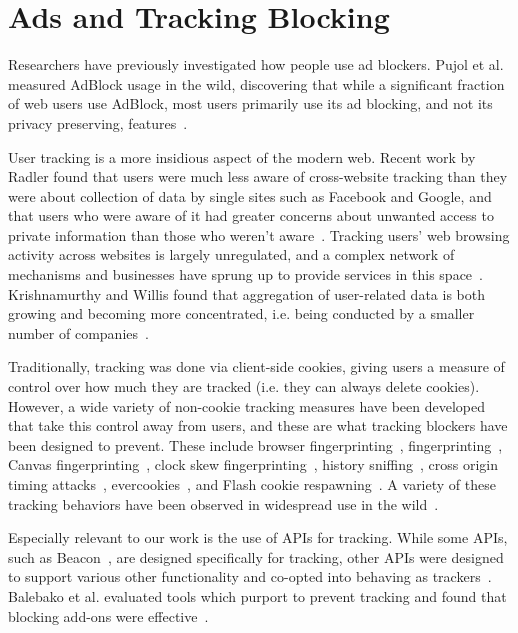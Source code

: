 \section{Ads and Tracking Blocking}
\label{background:ads-tracking-blocking}

Researchers have previously investigated how people use ad blockers.
Pujol et al. measured AdBlock usage in the wild, discovering that while a
significant fraction of web users use AdBlock, most users
primarily use its ad blocking, and not its privacy preserving,
features~\cite{pujolannoyed}.

User tracking is a more insidious aspect of the modern web. Recent work by Radler
found that users were much less aware of cross-website tracking than they were
about collection of data by single sites such as Facebook and Google, and that
users who were aware of it had greater concerns about unwanted access to
private information than those who weren't aware~\cite{rader2014awareness}.
Tracking users' web browsing activity across websites is largely unregulated,
and a complex network of mechanisms and businesses have sprung up to provide services
in this space~\cite{falahrastegar2014anatomy}.
Krishnamurthy and Willis found that aggregation of user-related data is both
growing and becoming more concentrated, i.e. being conducted by a smaller number
of companies~\cite{krishnamurthy2009privacy}.

Traditionally, tracking was done via client-side cookies, giving users a measure
of control over how much they are tracked (i.e. they can always delete cookies).
However, a wide variety of non-cookie tracking measures have been developed that
take this control away from users, and these are what tracking blockers have
been designed to prevent. These include browser
fingerprinting~\cite{eckersley2010unique}, \JS
fingerprinting~\cite{mowery2011fingerprinting,mulazzani2013fast}, Canvas
fingerprinting~\cite{mowery2012pixel}, clock skew
fingerprinting~\cite{kohno2005remote}, history
sniffing~\cite{jang2010empirical}, cross origin timing attacks~\cite{van2015clock},
evercookies~\cite{evercookies}, and Flash cookie
respawning~\cite{soltani2010flash,ayenson2011flash}.  A variety of these
tracking behaviors have been observed in widespread use in the
wild~\cite{soltani2010flash,ayenson2011flash,acar2014web,nikiforakis2013cookieless,mcdonald2011survey,olejnik2014selling,sorensen2013zombie}.

Especially relevant to our work is the use of \JS APIs for tracking.
While some APIs, such as Beacon~\cite{beaconapi}, are designed specifically for
tracking, other APIs were designed to support various other functionality and
co-opted into behaving as trackers~\cite{mowery2012pixel,fingerprintjs2}.
Balebako et al. evaluated tools which purport to prevent tracking and found that
blocking add-ons were effective~\cite{balebako2012measuring}.

